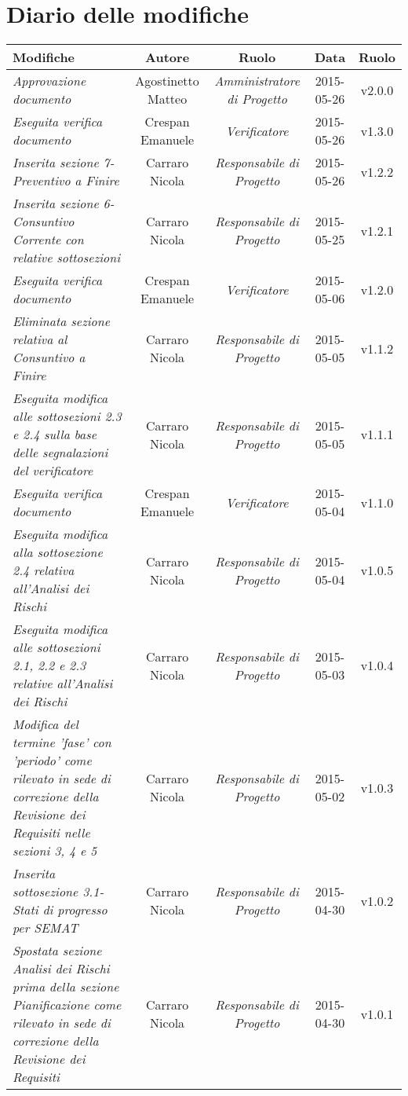\newpage
\section*{Diario delle modifiche}

\begin{table}[h]
\centering
\begin{tabular}{|p{}|c|c|c|c|}
	\toprule
		\textbf{Modifiche} & \textbf{Autore} & \textbf{Ruolo} & \textbf{Data} & \textbf{Ruolo} \\
	\midrule
	\midrule
		\textit{Approvazione documento} & Agostinetto Matteo & \textit{Amministratore di Progetto} & 2015-05-26 & v2.0.0 \\
	\midrule
		\textit{Eseguita verifica documento} & Crespan Emanuele & \textit{Verificatore} & 2015-05-26 & v1.3.0 \\
	\midrule
		\textit{Inserita sezione 7-Preventivo a Finire} & Carraro Nicola & \textit{Responsabile di Progetto} & 2015-05-26 & v1.2.2 \\
	\midrule
		\textit{Inserita sezione 6-Consuntivo Corrente con relative sottosezioni} & Carraro Nicola & \textit{Responsabile di Progetto} & 2015-05-25 & v1.2.1 \\
	\midrule
		\textit{Eseguita verifica documento} & Crespan Emanuele & \textit{Verificatore} & 2015-05-06 & v1.2.0 \\
	\midrule
		\textit{Eliminata sezione relativa al Consuntivo a Finire} & Carraro Nicola & \textit{Responsabile di Progetto} & 2015-05-05 & v1.1.2 \\
	\midrule
		\textit{Eseguita modifica alle sottosezioni 2.3 e 2.4 sulla base delle segnalazioni del verificatore} & Carraro Nicola & \textit{Responsabile di Progetto} & 2015-05-05 & v1.1.1 \\
	\midrule
		\textit{Eseguita verifica documento} & Crespan Emanuele & \textit{Verificatore} & 2015-05-04 & v1.1.0 \\
	\midrule
		\textit{Eseguita modifica alla sottosezione 2.4 relativa all'Analisi dei Rischi} & Carraro Nicola & \textit{Responsabile di Progetto} & 2015-05-04 & v1.0.5 \\
	\midrule
		\textit{Eseguita modifica alle sottosezioni 2.1, 2.2 e 2.3 relative all'Analisi dei Rischi} & Carraro Nicola & \textit{Responsabile di Progetto} & 2015-05-03 & v1.0.4 \\
	\midrule
		\textit{Modifica del termine 'fase' con 'periodo' come rilevato in sede di correzione della Revisione dei Requisiti nelle sezioni 3, 4 e 5} & Carraro Nicola & \textit{Responsabile di Progetto} & 2015-05-02 & v1.0.3 \\
	\midrule
		\textit{Inserita sottosezione 3.1-Stati di progresso per SEMAT} & Carraro Nicola & \textit{Responsabile di Progetto} & 2015-04-30 & v1.0.2 \\
	\midrule
		\textit{Spostata sezione Analisi dei Rischi prima della sezione Pianificazione come rilevato in sede di correzione della Revisione dei Requisiti} & Carraro Nicola & \textit{Responsabile di Progetto} & 2015-04-30 & v1.0.1 \\
	\bottomrule
\end{tabular}	
\end{table}

